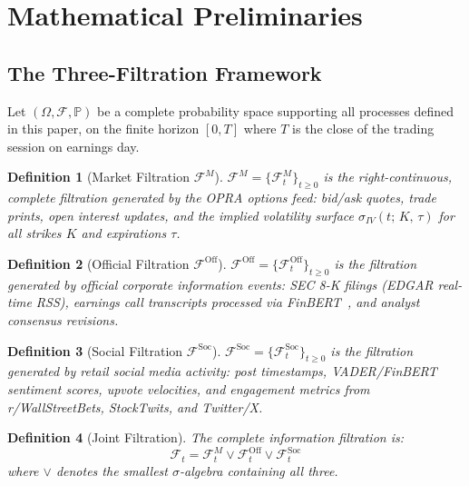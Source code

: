 \documentclass[10pt,twocolumn]{article}
\newtheorem{definition}{Definition}[section]
\newcommand{\F}{\mathcal{F}}
\newcommand{\Prob}{\mathbb{P}}
\begin{document}
\section{Mathematical Preliminaries}
\label{sec:prelim}

\subsection{The Three-Filtration Framework}

Let $(\Omega,\mathcal{F},\Prob)$ be a complete probability space supporting
all processes defined in this paper, on the finite horizon $[0,T]$ where $T$
is the close of the trading session on earnings day.

\begin{definition}[Market Filtration $\F^M$]
\label{def:fm}
$\F^M=\{\F^M_t\}_{t\ge0}$ is the right-continuous, complete filtration
generated by the OPRA options feed: bid/ask quotes, trade prints, open
interest updates, and the implied volatility surface
$\sigma_{IV}(t;\,K,\,\tau)$ for all strikes $K$ and expirations $\tau$.
\end{definition}

\begin{definition}[Official Filtration $\F^{\mathrm{Off}}$]
\label{def:foff}
$\F^{\mathrm{Off}}=\{\F^{\mathrm{Off}}_t\}_{t\ge0}$ is the filtration
generated by official corporate information events: SEC 8-K filings (EDGAR
real-time RSS), earnings call transcripts processed via
FinBERT~\cite{araci2019}, and analyst consensus revisions.
\end{definition}

\begin{definition}[Social Filtration $\F^{\mathrm{Soc}}$]
\label{def:fsoc}
$\F^{\mathrm{Soc}}=\{\F^{\mathrm{Soc}}_t\}_{t\ge0}$ is the filtration
generated by retail social media activity: post timestamps, VADER/FinBERT
sentiment scores, upvote velocities, and engagement metrics from
r/WallStreetBets, StockTwits, and Twitter/X.
\end{definition}

\begin{definition}[Joint Filtration]
\label{def:joint}
The complete information filtration is:
\begin{equation}
\label{eq:filtration}
\F_t = \F^M_t \vee \F^{\mathrm{Off}}_t \vee \F^{\mathrm{Soc}}_t
\end{equation}
where $\vee$ denotes the smallest $\sigma$-algebra containing all three.
\end{definition}
\end{document}
